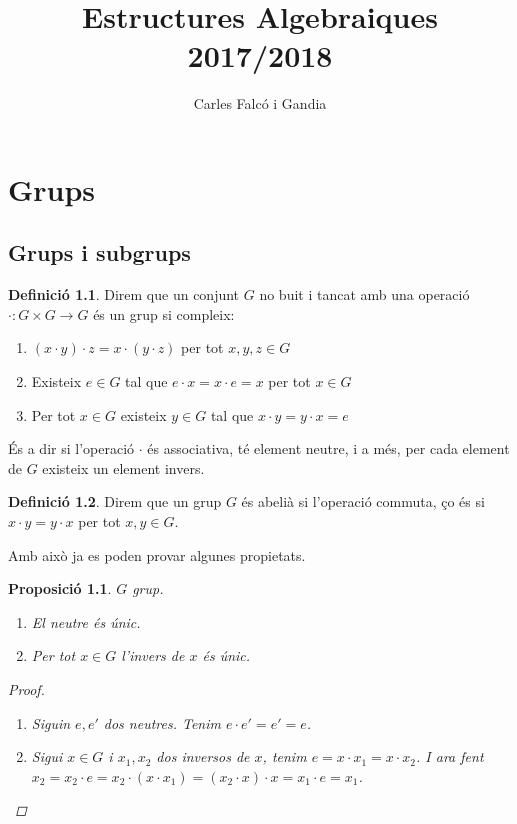 \documentclass[a4paper,11pt]{report}
\title{\sffamily Estructures Algebraiques\\ 2017/2018}
\author{\sffamily Carles Falcó i Gandia}
\date{ }
\newcommand\blankpage{%
	\null
	\thispagestyle{empty}%
	\addtocounter{page}{-1}%
	\newpage}
\theoremstyle{theorem}
\newtheorem{proposicio}{\normalfont \sffamily\bfseries Proposició}[section]
\theoremstyle{definition}
\newtheorem{definicio}{\normalfont\sffamily\bfseries Definició}[section]
\begin{document}
	\begin{titlingpage}
	\maketitle
	

\end{titlingpage}
	\afterpage{\blankpage}
\thispagestyle{plain}
	\tableofcontents
	\newpage
	\pagestyle{fancy}
	\chapter{Grups}
		
		\section{Grups i subgrups}
	\begin{definicio}
		Direm que un conjunt $G$ no buit i tancat amb una operació $\cdot:G\times G\rightarrow G$ és un grup si compleix:
		\begin{enumerate}
			\item  $(x\cdot y)\cdot z=x\cdot (y\cdot z)$ per tot $x,y,z\in G$
			\item Existeix $e\in G$ tal que $e\cdot x=x\cdot e=x$ per tot $x\in G$ 
			\item Per tot $x\in G$ existeix $y\in G$ tal que $x\cdot y=y\cdot x=e$
		\end{enumerate}
	És a dir si l'operació $\cdot$ és associativa, té element neutre, i a més, per cada element de $G$ existeix un element invers.
	\end{definicio}
\begin{definicio}
	Direm que un grup $G$ és abelià si l'operació commuta, ço és si
		$
			x\cdot y=y\cdot x
		$
		per tot $x,y\in G$.
\end{definicio}
Amb això ja es poden provar algunes propietats.
\begin{proposicio}
	$G$ grup.
	\begin{enumerate}
		\item El neutre és únic.
		\item Per tot $x\in G$ l'invers de $x$ és únic.
	\end{enumerate}
\begin{proof} 
	
	\begin{enumerate}
		\item Siguin $e,e'$ dos neutres. Tenim $e\cdot e'=e'=e$.
		\item Sigui $x\in G$ i $x_1,x_2$ dos inversos de $x$, tenim $e=x\cdot x_1=x\cdot x_2$. I ara fent $x_2=x_2\cdot e=x_2\cdot (x\cdot x_1)=(x_2\cdot x)\cdot x=x_1\cdot e=x_1$.
	\end{enumerate}
\end{proof}
\end{proposicio}
\end{document}
